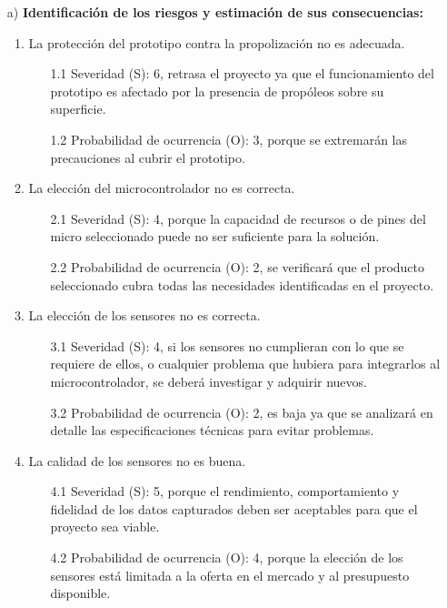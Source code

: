 \documentclass[
11pt, %
codirector, %
]{charter}
\begin{document}
\begin{itemize}[font=\bfseries]
	\item[a)] {\bf Identificación de los riesgos y estimación de sus consecuencias:}
	\begin{enumerate}
		\item La protección del prototipo contra la propolización no es adecuada.
\begin{itemize}
	\item[1.1] Severidad (S): 6, retrasa el proyecto ya que el funcionamiento del prototipo es afectado por la presencia de propóleos sobre su superficie.
	\item[1.2] Probabilidad de ocurrencia (O): 3, porque se extremarán las precauciones al cubrir el prototipo.
\end{itemize} 		
		\item La elección del microcontrolador no es correcta.
\begin{itemize}
	\item[2.1] Severidad (S): 4, porque la capacidad de recursos o de pines del micro seleccionado puede no ser suficiente para la solución. 
	\item[2.2] Probabilidad de ocurrencia (O): 2, se verificará que el producto seleccionado cubra todas las necesidades identificadas en el proyecto.
\end{itemize} 				
		\item La elección de los sensores no es correcta.
\begin{itemize}
	\item[3.1] Severidad (S): 4, si los sensores no cumplieran con lo que se requiere de ellos, o cualquier problema que hubiera para integrarlos al microcontrolador, se deberá investigar y adquirir nuevos.
	\item[3.2] Probabilidad de ocurrencia (O): 2, es baja ya que se analizará en detalle las especificaciones técnicas para evitar problemas.
\end{itemize} 				
		\item La calidad de los sensores no es buena.
\begin{itemize}
	\item[4.1] Severidad (S): 5, porque el rendimiento, comportamiento y fidelidad de los datos capturados deben ser aceptables para que el proyecto sea viable.
	\item[4.2] Probabilidad de ocurrencia (O): 4, porque la elección de los sensores está limitada a la oferta en el mercado y al presupuesto disponible.
\end{itemize} 				

\end{enumerate}
\end{itemize}
\end{document}
